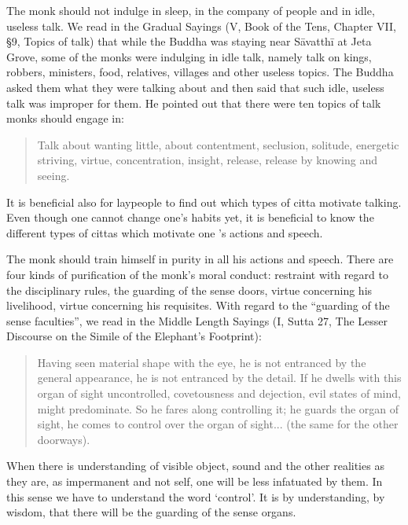 \documentclass{book}
\begin{document}
The monk should not indulge in sleep, in the company of people and in
idle, useless talk. We read in the Gradual Sayings (V, Book of the Tens,
Chapter VII, §9, Topics of talk) that while the Buddha was staying near
Sāvatthī at Jeta Grove, some of the monks were indulging in idle talk,
namely talk on kings, robbers, ministers, food, relatives, villages and
other useless topics. The Buddha asked them what they were talking about
and then said that such idle, useless talk was improper for them. He
pointed out that there were ten topics of talk monks should engage in:

\begin{quote}
Talk about wanting little, about contentment, seclusion, solitude,
energetic striving, virtue, concentration, insight, release, release by
knowing and seeing.
\end{quote}

It is beneficial also for laypeople to find out which types of citta
motivate talking. Even though one cannot change one's habits yet, it is
beneficial to know the different types of cittas which motivate one 's
actions and speech.

The monk should train himself in purity in all his actions and speech.
There are four kinds of purification of the monk's moral conduct:
restraint with regard to the disciplinary rules, the guarding of the
sense doors, virtue concerning his livelihood, virtue concerning his
requisites. With regard to the ``guarding of the sense faculties'', we
read in the Middle Length Sayings (I, Sutta 27, The Lesser Discourse on
the Simile of the Elephant's Footprint):

\begin{quote}
Having seen material shape with the eye, he is not entranced by the 
general appearance, he is not entranced by the detail. If he dwells 
with this organ of sight uncontrolled, covetousness and dejection, evil states of mind, might predominate. So he fares along controlling it; he guards the organ of sight, he comes to control over the organ of 
sight...
(the same for the other doorways).
\end{quote}

When there is understanding of visible object, sound and the other
realities as they are, as impermanent and not self, one will be less
infatuated by them. In this sense we have to understand the word 
`control'. It is by understanding, by wisdom, that there will be the guarding of the sense organs.
\end{document}
